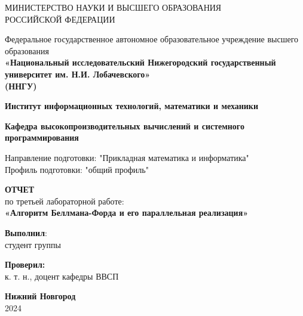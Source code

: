 \documentclass[12pt]{article}
\begin{document}
\begin{titlepage}
\centering
{МИНИСТЕРСТВО НАУКИ И ВЫСШЕГО ОБРАЗОВАНИЯ\\
РОССИЙСКОЙ ФЕДЕРАЦИИ}

\vspace{1em}

Федеральное государственное автономное образовательное учреждение высшего образования\\
\textbf{«Национальный исследовательский Нижегородский государственный университет им. Н.И. Лобачевского»}\\
\textbf{(ННГУ)}

\vspace{2em}

\textbf{Институт информационных технологий, математики и механики}

\vspace{1em}

\textbf{Кафедра высокопроизводительных вычислений и системного программирования}

\vspace{2em}

Направление подготовки: "Прикладная математика и информатика"\\
Профиль подготовки: "общий профиль" \\

\vspace{4em}


\textbf{\Large ОТЧЕТ}\\
по третьей лабораторной работе:\\
\vspace{1em}
\textbf{«Алгоритм Беллмана-Форда и его параллельная реализация»}

\begin{flushright}
\textbf{Выполнил}:\\[5pt]
студент группы  \\[1em]
\end{flushright}

\vspace{1em}

\begin{flushright}

\noindent\textbf{Проверил:} \\[5pt]
к. т. н., доцент кафедры ВВСП \\[5pt]
\end{flushright}

\vspace{1em}

\vfill
\textbf{Нижний Новгород}\\
2024
\end{titlepage}
\end{document}
